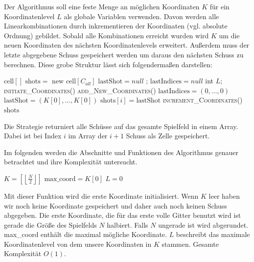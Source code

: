 \documentclass[a4paper,12pt]{llncs}
\numberwithin{equation}{section}
\begin{document}
Der Algorithmus soll eine feste Menge an möglichen Koordinaten $K$ für ein Koordinatenlevel $L$ als globale Variablen verwenden. Davon werden alle Linearkombinationen durch inkrementieren der Koordinaten (vgl. absolute Ordnung) gebildet. Sobald alle Kombinationen erreicht wurden wird $K$ um die neuen Koordinaten des nächsten Koordinatenlevels erweitert. Außerdem muss der letzte abgegebene Schuss gespeichert werden um daraus den nächsten Schuss zu berechnen. Diese grobe Struktur lässt sich folgendermaßen darstellen:

\begin{tcolorbox}
	\begin{algorithmic}
		\State $\text{cell}[]\text{ shots} = \text{ new } \text{cell}[C_{all}]$
		\State $\text{lastShot}=null$ ; $\text{lastIndices}=null$
		\State int $L$;
		\State \textsc{initiate\_Coordinates}()
		\EndIf
		\State \textsc{add\_New\_Coordinates}()
		\EndIf
		\State $\text{lastIndices} = (0,\dots,0)$
		\State $\text{lastShot} = (K[0],\dots,K[0])$
		\State $\text{shots}[i] = \text{lastShot}$
		\Else
		\State \textsc{increment\_Coordinates}()
		\EndIf
		\EndFor
		\State\Return $\text{shots}$
		\EndFunction
	\end{algorithmic}
\end{tcolorbox}

Die Strategie returniert alle Schüsse auf das gesamte Spielfeld in einem Array. Dabei ist bei Index $i$ im Array der $i+1$ Schuss als Zelle gespeichert.

Im folgenden werden die Abschnitte und Funktionen des Algorithmus genauer betrachtet und ihre Komplexität untersucht.

\begin{tcolorbox}
	\begin{algorithmic}
		\Function{initiate\_Coordinates}{}{}
		\State $K=\left[\left\lfloor\frac{N}{2}\right\rfloor\right]$
		\State $\text{max\_coord}=K\left[0\right]$
		\State $L=0$
		\EndFunction
	\end{algorithmic}
\end{tcolorbox}

Mit dieser Funktion wird die erste Koordinate initialisiert. Wenn $K$ leer haben wir noch keine Koordinate gespeichert und daher auch noch keinen Schuss abgegeben. Die erste Koordinate, die für das erste volle Gitter benutzt wird ist gerade die Größe des Spielfelds $N$ halbiert. Falls $N$ ungerade ist wird abgerundet. max\_coord enthält die maximal mögliche Koordinate. $L$ beschreibt das maximale Koordinatenlevel von dem unsere Koordinaten in $K$ stammen. Gesamte Komplexität $O(1)$.
\end{document}
